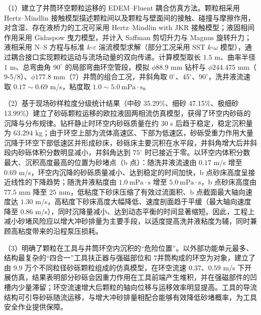 （1）建立了井筒环空颗粒运移的 EDEM--Fluent 耦合仿真方法。颗粒相采用 Hertz--Mindlin 接触模型描述颗粒间以及颗粒与壁面间的接触、碰撞与摩擦作用，对含湿、存在液桥力的工况可采用 Hertz--Mindlin with JKR 接触模型；液固相间作用采用 Gidaspow 曳力模型，并计入 Saffman 剪切升力与 Magnus 旋转升力；液相采用 N--S 方程与标准 $k$-$\varepsilon$ 湍流模型求解（部分工况采用 SST $k$-$\omega$ 模型），通过耦合接口实现颗粒运动与流场动量的双向传递。计算模型取长 $1.5$ m、曲率半径 $1$ m、总弯曲角 $90^\circ$ 的局部弯曲环空管段，模拟 $\phi 88.9$ mm 钻杆与 $\phi 244.475$ mm（$9$-5/8\inch）、$\phi 177.8$ mm（$7$\inch）井筒的组合工况，井斜角取 $0^\circ$、$45^\circ$、$90^\circ$，洗井液流速取 $0.17\sim0.69$ m/s，粘度取 $1.0\sim5.0\ \mathrm{mPa}\cdot\mathrm{s}$。

（2）基于现场砂样粒度分级统计结果（中砂 35.29\%、细砂 47.15\%、极细砂 13.99\%）建立了砂砾颗粒运移的欧拉液固两相流仿真模型，获得了环空内砂砾的沉降与分布规律。钻杆静止时环空内砂砾质量在约 $30$ s 后趋于稳定，稳定沉积量为 $63.294$ kg；由于环空上部为流体高速区、下部为低速区，砂砾受重力作用大量沉降于环空下部低速区并形成砂床，砂砾床主要沉积在水平段，井斜角增大后井斜段内砂砾体积分数明显减小，井斜角达到 $75^\circ$ 时已接近于零。以环空内体积分数最大、沉积高度最高的位置为砂堵点（b 点）：随洗井液流速由 $0.17$ m/s 增至 $0.69$ m/s，环空内沉降的砂砾质量减小、达到稳定的时间加快，b 点砂床高度呈接近线性的下降趋势；随洗井液粘度由 $1.0\ \mathrm{mPa}\cdot\mathrm{s}$ 增至 $5.0\ \mathrm{mPa}\cdot\mathrm{s}$，b 点砂床高度由 $77.5$ mm 降至 $25$ mm，低粘度下砂床压缩了有效过流面积、b 点截面最大轴向速度达 $1.30$ m/s，高粘度下砂床高度大幅降低、速度剖面趋于平缓（最大轴向速度降至 $0.86$ m/s），同时沉降量减小、达到动态平衡的时间显著缩短。因此，工程上减小砂堵风险应以增大冲砂排量为主要手段，以适度提高洗井液粘度为辅，同时兼顾高粘度带来的沿程泵压损耗。

（3）明确了颗粒在工具与井筒环空内沉积的“危险位置”。以外部功能单元最多、结构最复杂的“四合一”工具扶正器与强磁部位和 $7$\inch 井筒构成的环空为对象，建立了由 $9.9$ 万个不同粒径砂砾颗粒组成的仿真模型，在环空流速 $0.37$、$0.59$ m/s 下开展仿真，结果表明部分砂砾会因重力作用在工具前端产生堆积，并在强磁部件的凹槽内少量滞留；环空流速增大后颗粒的轴向位移与运移效率明显提高。工具的导流结构可引导砂砾随流运移，与增大冲砂排量相配合能够有效降低砂堵概率，为工具安全作业提供保障。

